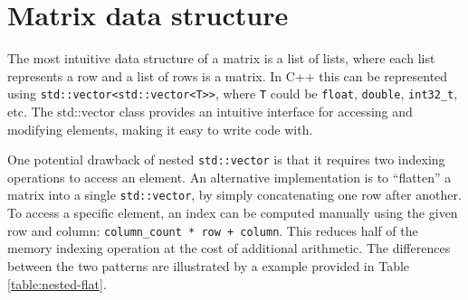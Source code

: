 \documentclass[logo,bsc,singlespacing,parskip]{infthesis}
\begin{document}


\section{Matrix data structure}

The most intuitive data structure of a matrix is a list of lists, where each
list represents a row and a list of rows is a matrix. In C++ this can be
represented using \texttt{std::vector<std::vector<T>>}, where \texttt{T} could
be \texttt{float}, \texttt{double}, \texttt{int32\_t}, etc. The std::vector
class provides an intuitive interface for accessing and modifying elements,
making it easy to write code with. 

One potential drawback of nested \texttt{std::vector} is that it requires two
indexing operations to access an element. An alternative implementation is to
“flatten” a matrix into a single \texttt{std::vector}, by simply concatenating
one row after another. To access a specific element, an index can be computed
manually using the given row and column: \texttt{column\_count * row + column}.
This reduces half of the memory indexing operation at the cost of additional
arithmetic. The differences between the two patterns are illustrated by a
example provided in Table \ref{table:nested-flat}. 
\end{document}

